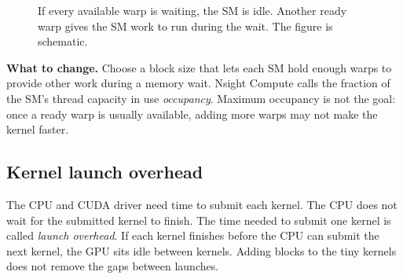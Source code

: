 \documentclass[11pt]{article}
\numberwithin{equation}{section}
\numberwithin{figure}{section}
\numberwithin{table}{section}
\begin{document}
\begin{figure}[htbp]
  \centering
  \caption{If every available warp is waiting, the SM is idle.  Another ready warp
  gives the SM work to run during the wait.  The figure is schematic.}
  \label{fig:latency-hiding}
\end{figure}
\FloatBarrier

\textbf{What to change.}
Choose a block size that lets each SM hold enough warps to provide other work during
a memory wait.  Nsight Compute calls the fraction of the SM's thread capacity in
use \emph{occupancy}.  Maximum occupancy is not the goal: once a ready warp is
usually available, adding more warps may not make the kernel faster.

\subsection{Kernel launch overhead}

The CPU and CUDA driver need time to submit each kernel.  The CPU does not wait for
the submitted kernel to finish.  The time needed to submit one kernel is called
\emph{launch overhead}.  If each kernel finishes before the CPU can submit the next
kernel, the GPU sits idle between kernels.  Adding blocks to the tiny kernels does
not remove the gaps between launches.
\end{document}
